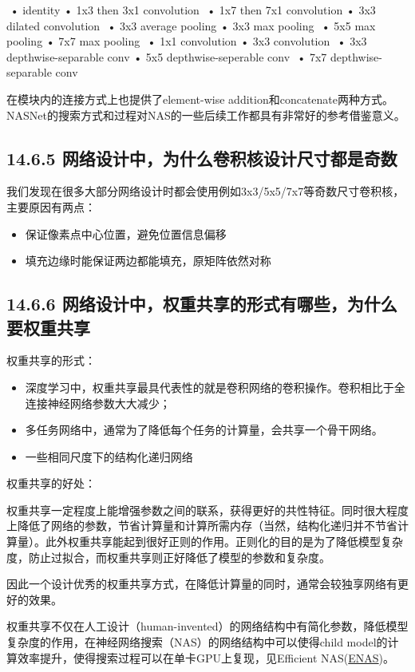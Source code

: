 ​ • identity • 1x3 then 3x1 convolution ​ • 1x7 then 7x1 convolution •
3x3 dilated convolution ​ • 3x3 average pooling • 3x3 max pooling ​ •
5x5 max pooling • 7x7 max pooling ​ • 1x1 convolution • 3x3 convolution
​ • 3x3 depthwise-separable conv • 5x5 depthwise-seperable conv ​ • 7x7
depthwise-separable conv

在模块内的连接方式上也提供了element-wise
addition和concatenate两种方式。NASNet的搜索方式和过程对NAS的一些后续工作都具有非常好的参考借鉴意义。

\subsection{14.6.5
网络设计中，为什么卷积核设计尺寸都是奇数}\label{ux7f51ux7edcux8bbeux8ba1ux4e2dux4e3aux4ec0ux4e48ux5377ux79efux6838ux8bbeux8ba1ux5c3aux5bf8ux90fdux662fux5947ux6570}

我们发现在很多大部分网络设计时都会使用例如3x3/5x5/7x7等奇数尺寸卷积核，主要原因有两点：

\begin{itemize}
\item
  保证像素点中心位置，避免位置信息偏移
\item
  填充边缘时能保证两边都能填充，原矩阵依然对称
\end{itemize}

\subsection{14.6.6
网络设计中，权重共享的形式有哪些，为什么要权重共享}\label{ux7f51ux7edcux8bbeux8ba1ux4e2dux6743ux91cdux5171ux4eabux7684ux5f62ux5f0fux6709ux54eaux4e9bux4e3aux4ec0ux4e48ux8981ux6743ux91cdux5171ux4eab}

权重共享的形式：

\begin{itemize}
\item
  深度学习中，权重共享最具代表性的就是卷积网络的卷积操作。卷积相比于全连接神经网络参数大大减少；
\item
  多任务网络中，通常为了降低每个任务的计算量，会共享一个骨干网络。
\item
  一些相同尺度下的结构化递归网络
\end{itemize}

权重共享的好处：

​
权重共享一定程度上能增强参数之间的联系，获得更好的共性特征。同时很大程度上降低了网络的参数，节省计算量和计算所需内存（当然，结构化递归并不节省计算量）。此外权重共享能起到很好正则的作用。正则化的目的是为了降低模型复杂度，防止过拟合，而权重共享则正好降低了模型的参数和复杂度。

​
因此一个设计优秀的权重共享方式，在降低计算量的同时，通常会较独享网络有更好的效果。

权重共享不仅在人工设计（human-invented）的网络结构中有简化参数，降低模型复杂度的作用，在神经网络搜索（NAS）的网络结构中可以使得child
model的计算效率提升，使得搜索过程可以在单卡GPU上复现，见Efficient
NAS(\href{https://arxiv.org/abs/1802.03268}{ENAS})。
